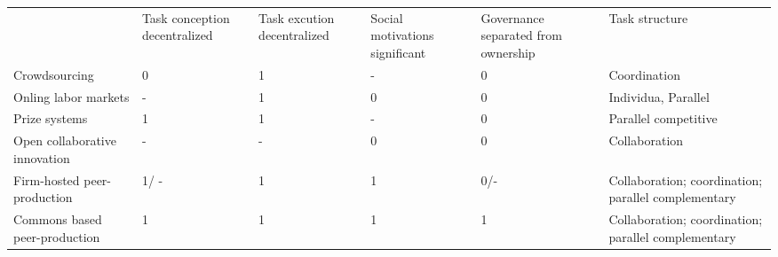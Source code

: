 \begin{table}[h]
\begin{tabular}{llllll}
 & Task conception decentralized & Task excution decentralized & Social motivations significant & Governance separated from ownership & Task structure &                                                     \\
Crowdsourcing                 & 0                           & 1                              & -                                   & 0              & Coordination                                        \\
Onling labor markets          & -                           & 1                              & 0                                   & 0              & Individua, Parallel                                 \\
Prize systems                 & 1                           & 1                              & -                                   & 0              & Parallel competitive                                \\
Open collaborative innovation & -                           & -                              & 0                                   & 0              & Collaboration                                       \\
Firm-hosted peer-production   & 1/ -                        & 1                              & 1                                   & 0/-            & Collaboration; coordination; parallel complementary \\
Commons based peer-production & 1                           & 1                              & 1                                   & 1              & Collaboration; coordination; parallel complementary
\end{tabular}
\end{table}